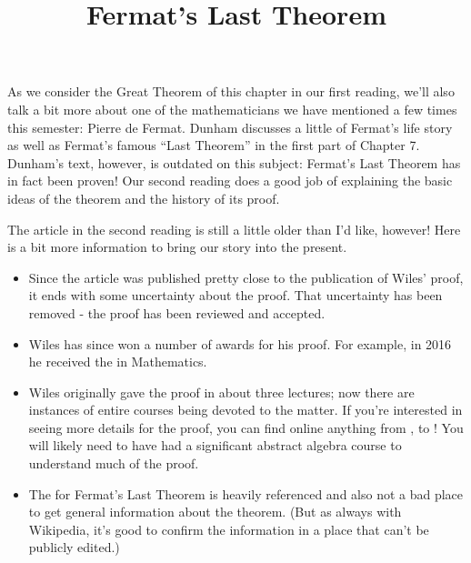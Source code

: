 \documentclass[nooutcomes]{ximera}
\title{Fermat's Last Theorem}
\begin{document}
\begin{abstract}
    
\end{abstract}
\maketitle

As we consider the Great Theorem of this chapter in our first reading,
we'll also talk a bit more about one of the mathematicians we have
mentioned a few times this semester: Pierre de Fermat.  Dunham discusses 
a little of Fermat's life story as well as Fermat's famous ``Last Theorem'' 
in the first part of Chapter 7. Dunham's text, however, is outdated on 
this subject: Fermat's Last Theorem has in fact been proven!  Our second
reading does a good job of explaining the basic ideas of the theorem
and the history of its proof.

The article in the second reading is still a little older than I'd like, 
however!  Here is a bit more information to bring our story into the present.
\begin{itemize}
	\item Since the article was published pretty close to
          the publication of Wiles' proof, it ends with some
          uncertainty about the proof.  That uncertainty has been
          removed - the proof has been reviewed and accepted.
	\item Wiles has since won a number of awards for his proof.  For example, in 2016 he received the  in Mathematics.  
	\item Wiles originally gave the proof in about three lectures; now 
	there are instances of entire courses being devoted to the matter.  
	If you're interested in seeing more details for the proof, you can find online anything from 
	, 
	to !
	You will likely need to have had a significant abstract algebra course to understand much of the proof.
	\item The  for Fermat's Last Theorem is heavily referenced and also not a bad place to get general information about the theorem.  (But as always with Wikipedia, it's good to confirm the information in a place that can't be publicly edited.)
\end{itemize}
\end{document}

